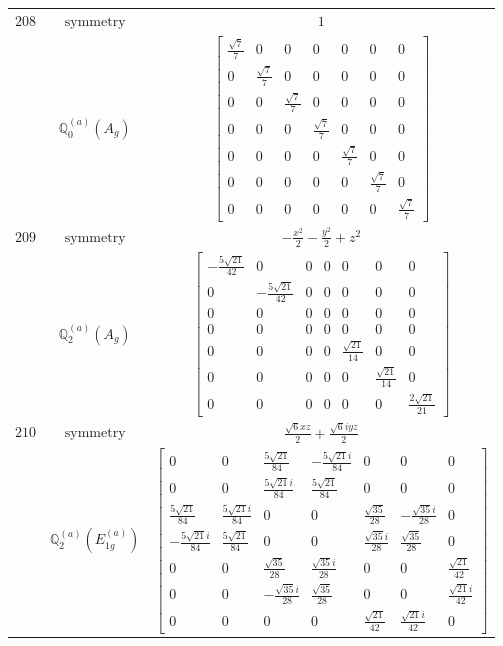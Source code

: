 \documentclass[fleqn,8pt,landscape]{jsarticle}
\begin{document}
\begin{longtable}{ccc}
$ 208 $ & $ \text{symmetry} $ & $ 1 $ \\
$  $ & $ \mathbb{Q}_{0}^{(a)}(A_{g}) $ & $ \begin{bmatrix} \frac{\sqrt{7}}{7} & 0 & 0 & 0 & 0 & 0 & 0 \\ 0 & \frac{\sqrt{7}}{7} & 0 & 0 & 0 & 0 & 0 \\ 0 & 0 & \frac{\sqrt{7}}{7} & 0 & 0 & 0 & 0 \\ 0 & 0 & 0 & \frac{\sqrt{7}}{7} & 0 & 0 & 0 \\ 0 & 0 & 0 & 0 & \frac{\sqrt{7}}{7} & 0 & 0 \\ 0 & 0 & 0 & 0 & 0 & \frac{\sqrt{7}}{7} & 0 \\ 0 & 0 & 0 & 0 & 0 & 0 & \frac{\sqrt{7}}{7} \end{bmatrix} $ \\ \hline
$ 209 $ & $ \text{symmetry} $ & $ - \frac{x^{2}}{2} - \frac{y^{2}}{2} + z^{2} $ \\
$  $ & $ \mathbb{Q}_{2}^{(a)}(A_{g}) $ & $ \begin{bmatrix} - \frac{5 \sqrt{21}}{42} & 0 & 0 & 0 & 0 & 0 & 0 \\ 0 & - \frac{5 \sqrt{21}}{42} & 0 & 0 & 0 & 0 & 0 \\ 0 & 0 & 0 & 0 & 0 & 0 & 0 \\ 0 & 0 & 0 & 0 & 0 & 0 & 0 \\ 0 & 0 & 0 & 0 & \frac{\sqrt{21}}{14} & 0 & 0 \\ 0 & 0 & 0 & 0 & 0 & \frac{\sqrt{21}}{14} & 0 \\ 0 & 0 & 0 & 0 & 0 & 0 & \frac{2 \sqrt{21}}{21} \end{bmatrix} $ \\ \hline
$ 210 $ & $ \text{symmetry} $ & $ \frac{\sqrt{6} x z}{2} + \frac{\sqrt{6} i y z}{2} $ \\
$  $ & $ \mathbb{Q}_{2}^{(a)}(E_{1g}^{(a)}) $ & $ \begin{bmatrix} 0 & 0 & \frac{5 \sqrt{21}}{84} & - \frac{5 \sqrt{21} i}{84} & 0 & 0 & 0 \\ 0 & 0 & \frac{5 \sqrt{21} i}{84} & \frac{5 \sqrt{21}}{84} & 0 & 0 & 0 \\ \frac{5 \sqrt{21}}{84} & \frac{5 \sqrt{21} i}{84} & 0 & 0 & \frac{\sqrt{35}}{28} & - \frac{\sqrt{35} i}{28} & 0 \\ - \frac{5 \sqrt{21} i}{84} & \frac{5 \sqrt{21}}{84} & 0 & 0 & \frac{\sqrt{35} i}{28} & \frac{\sqrt{35}}{28} & 0 \\ 0 & 0 & \frac{\sqrt{35}}{28} & \frac{\sqrt{35} i}{28} & 0 & 0 & \frac{\sqrt{21}}{42} \\ 0 & 0 & - \frac{\sqrt{35} i}{28} & \frac{\sqrt{35}}{28} & 0 & 0 & \frac{\sqrt{21} i}{42} \\ 0 & 0 & 0 & 0 & \frac{\sqrt{21}}{42} & \frac{\sqrt{21} i}{42} & 0 \end{bmatrix} $ \\ \hline

\end{longtable}
\end{document}
